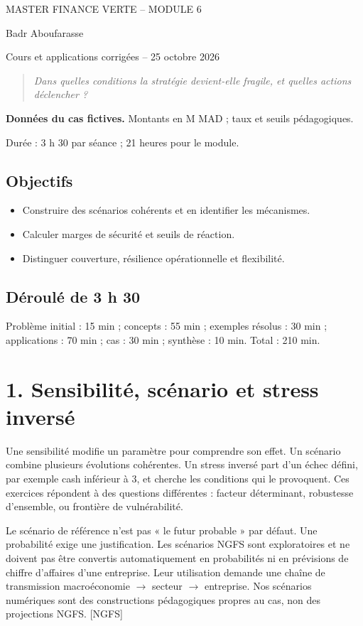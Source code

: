 \documentclass[12pt,a4paper]{article}
\begin{document}
\begin{center}{\small MASTER FINANCE VERTE -- MODULE 6}\par\vspace{8pt}{\Large\bfseries Séance 5 -- Résistance financière et décisions adaptatives}\par\vspace{6pt}Badr Aboufarasse\par{\small Cours et applications corrigées -- 25 octobre 2026}\end{center}
\begin{quote}\itshape Dans quelles conditions la stratégie devient-elle fragile, et quelles actions déclencher ?\end{quote}
\textbf{Données du cas fictives.} Montants en M MAD ; taux et seuils pédagogiques.\par Durée : 3 h 30 par séance ; 21 heures pour le module.

\subsection*{Objectifs}
\begin{itemize}\item Construire des scénarios cohérents et en identifier les mécanismes.\item Calculer marges de sécurité et seuils de réaction.\item Distinguer couverture, résilience opérationnelle et flexibilité.\end{itemize}
\subsection*{Déroulé de 3 h 30}
Problème initial : 15 min ; concepts : 55 min ; exemples résolus : 30 min ; applications : 70 min ; cas : 30 min ; synthèse : 10 min. Total : 210 min.

\section*{1. Sensibilité, scénario et stress inversé}
Une sensibilité modifie un paramètre pour comprendre son effet. Un scénario combine plusieurs évolutions cohérentes. Un stress inversé part d’un échec défini, par exemple cash inférieur à 3, et cherche les conditions qui le provoquent. Ces exercices répondent à des questions différentes : facteur déterminant, robustesse d’ensemble, ou frontière de vulnérabilité.


Le scénario de référence n’est pas « le futur probable » par défaut. Une probabilité exige une justification. Les scénarios NGFS sont exploratoires et ne doivent pas être convertis automatiquement en probabilités ni en prévisions de chiffre d’affaires d’une entreprise. Leur utilisation demande une chaîne de transmission macroéconomie $\rightarrow$ secteur $\rightarrow$ entreprise. Nos scénarios numériques sont des constructions pédagogiques propres au cas, non des projections NGFS. [NGFS]
\end{document}

